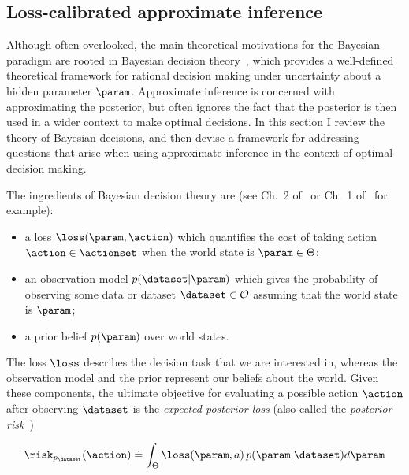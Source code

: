 \subsection{Loss-calibrated approximate inference}

Although often overlooked, the main theoretical motivations for the Bayesian paradigm are rooted in Bayesian decision theory~\citep{berger85decision}, which provides a well-defined theoretical framework for rational decision making under uncertainty about a hidden parameter $\param$. Approximate inference is concerned with approximating the posterior, but often ignores the fact that the posterior is then used in a wider context to make optimal decisions. In this section I review the theory of Bayesian decisions, and then devise a framework for addressing questions that arise when using approximate inference in the context of optimal decision making.

The ingredients of Bayesian decision theory are (see Ch.~2 of~\citep{robert01choice} or Ch.~1 of~\citep{berger85decision} for example):
\vspace{-.3cm}
\begin{itemize}
  \item a loss $\loss(\param,\action)$ which quantifies the cost of taking action $\action \in \actionset$ when the world state is $\param \in \Theta$; %
  \item an observation model $p(\dataset|\param)$ which gives the probability of observing some data or dataset $\dataset \in \mathcal{O}$ assuming that the world state is $\param$;
  \item a prior belief $p(\param)$ over world states.
\end{itemize}

The loss $\loss$ describes the decision task that we are interested in, whereas the observation model and the prior represent our beliefs about the world. Given these components, the ultimate objective for evaluating a possible action $\action$ after observing $\dataset$ is the \emph{expected posterior loss} (also called the \emph{posterior risk}~\citep{schervish95theory})

\begin{equation}
	\risk_{p_\dataset}(\action) \doteq \int_\Theta \loss(\param, a) \, p(\param|\dataset) d\param
\end{equation}

